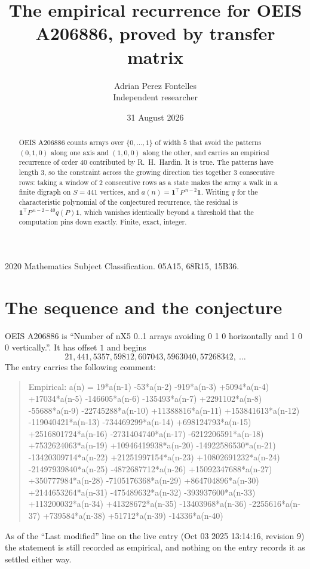 \documentclass[11pt,a4paper]{article}
\title{The empirical recurrence for OEIS A206886, proved by transfer matrix}
\author{Adrian Perez Fontelles\\ \small Independent researcher}
\date{31 August 2026}
\theoremstyle{plain}
\theoremstyle{definition}
\begin{document}
\maketitle

\begin{abstract}
OEIS A206886 counts arrays over $\{0,\dots,1\}$ of width $5$ that avoid the patterns
$(0,1,0)$ along one axis and $(1,0,0)$ along the other, and carries an empirical recurrence of
order $40$ contributed by R.~H.~Hardin. It is true. The patterns have length $3$, so
the constraint across the growing direction ties together $3$ consecutive rows: taking a
window of $2$ consecutive rows as a state makes the array a walk in a finite digraph
on $S=441$ vertices, and $a(n)=\mathbf{1}^{\!\top}P^{\,n-2}\mathbf{1}$. Writing $q$
for the characteristic polynomial of the conjectured recurrence, the residual is
$\mathbf{1}^{\!\top}P^{\,n-2-40}q(P)\mathbf{1}$, which vanishes identically
beyond a threshold that the computation pins down exactly. Finite, exact, integer.
\end{abstract}

\noindent\small 2020 Mathematics Subject Classification. 05A15, 68R15, 15B36.\normalsize

\section{The sequence and the conjecture}

OEIS A206886 is ``Number of nX5 0..1 arrays avoiding 0 1 0 horizontally and 1 0 0 vertically.''. It has offset
$1$ and begins
\[
21, 441, 5357, 59812, 607043, 5963040, 57268342,\ \dots
\]
The entry carries the following comment:
\begin{quote}\small
Empirical: a(n) = 19*a(n-1) -53*a(n-2) -919*a(n-3) +5094*a(n-4) +17034*a(n-5) -146605*a(n-6) -135493*a(n-7) +2291102*a(n-8) -55688*a(n-9) -22745288*a(n-10) +11388816*a(n-11) +153841613*a(n-12) -119040421*a(n-13) -734469299*a(n-14) +698124793*a(n-15) +2516801724*a(n-16) -2731404740*a(n-17) -6212206591*a(n-18) +7532624063*a(n-19) +10946419938*a(n-20) -14922586530*a(n-21) -13420309714*a(n-22) +21251997154*a(n-23) +10802691232*a(n-24) -21497939840*a(n-25) -4872687712*a(n-26) +15092347688*a(n-27) +350777984*a(n-28) -7105176368*a(n-29) +864704896*a(n-30) +2144653264*a(n-31) -475489632*a(n-32) -393937600*a(n-33) +113200032*a(n-34) +41328672*a(n-35) -13403968*a(n-36) -2255616*a(n-37) +739584*a(n-38) +51712*a(n-39) -14336*a(n-40)
\end{quote}
As of the ``Last modified'' line on the live entry (Oct 03 2025 13:14:16, revision
9) the statement is still recorded as empirical, and nothing on the entry
records it as settled either way.
\end{document}
